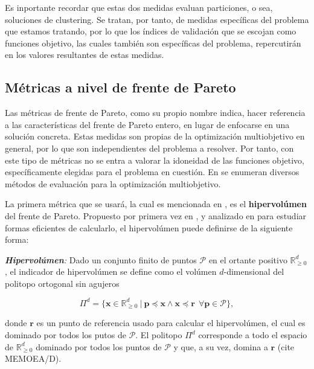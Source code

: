 Es inportante recordar que estas dos medidas evaluan particiones, o sea, soluciones de clustering. Se tratan, por tanto, de medidas específicas del problema que estamos tratando, por lo que los índices de validación que se escojan como funciones objetivo, las cuales también son específicas del problema, repercutirán en los valores resultantes de estas medidas.

\subsection{Métricas a nivel de frente de Pareto}

Las métricas de frente de Pareto, como su propio nombre indica, hacer referencia a las características del frente de Pareto entero, en lugar de enfocarse en una solución concreta. Estas medidas son propias de la optimización multiobjetivo en general, por lo que son independientes del problema a resolver. Por tanto, con este tipo de métricas no se entra a valorar la idoneidad de las funciones objetivo, específicamente elegidas para el problema en cuestión. En \cite{zitzler2003performance} se enumeran diversos métodos de evaluación para la optimización multiobjetivo.


La primera métrica que se usará, la cual es mencionada en \cite{zitzler2003performance}, es el \textbf{hipervolúmen} del frente de Pareto. Propuesto por primera vez en \cite{zitzler1998multiobjective}, y analizado en  \cite{beume2009complexity} para estudiar formas eficientes de calcularlo, el hipervolúmen puede definirse de la siguiente forma:

\begin{definicion}
	
	\emph{\textbf{Hipervolúmen}:} Dado un conjunto finito de puntos $\mathcal{P}$ en el ortante positivo $\mathbb{R}^d_{\ge 0}$, el indicador de hipervolúmen se define como el volúmen $d$-dimensional del politopo ortogonal sin agujeros
	
	\begin{equation}
		\Pi^d = \{ \textbf{x} \in  \mathbb{R}^d_{\ge 0} ~|~ \textbf{p} \preceq \textbf{x} \land \textbf{x} \preceq \textbf{r}~~\forall \textbf{p} \in \mathcal{P}\},
	\end{equation} 
	
	donde $\textbf{r}$ es un punto de referencia usado para calcular el hipervolúmen, el cual es dominado por todos los putos de $\mathcal{P}$. El politopo $\Pi^d$ corresponde a todo el espacio de $\mathbb{R}^d_{\ge 0}$ dominado por todos los puntos de $\mathcal{P}$ y que, a su vez, domina a $\textbf{r}$ \cite{beume2009complexity} (cite MEMOEA/D). 
	
\end{definicion}

